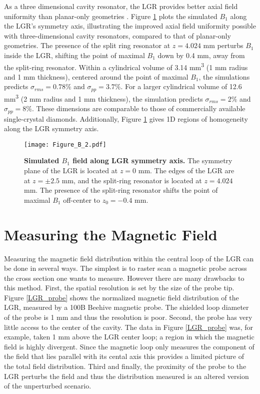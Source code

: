 As a three dimensional cavity resonator, the LGR provides better axial field uniformity than planar-only geometries \cite{floch2016towards,kapitanova2017dielectric,angerer2016collective}. Figure \ref{LGR_axial_simulated} plots the simulated $B_1$ along the LGR's symmetry axis, illustrating the improved axial field uniformity possible with three-dimensional cavity
resonators, compared to that of planar-only geometries. The presence of the split ring resonator at $z = 4.024$ mm perturbs $B_1$ inside the LGR, shifting the point of maximal $B_1$ down by 0.4 mm, away from the split-ring resonator. Within a cylindrical volume of 3.14 mm\textsuperscript{3} (1 mm radius and 1 mm thickness), centered around the point of maximal $B_1$, the simulations predicts $\sigma_{rms} = 0.78\%$ and $\sigma_{pp} = 3.7\%$. For a larger cylindrical volume of 12.6 mm\textsuperscript{3} (2 mm radius and 1 mm thickness), the simulation predicts $\sigma_{rms} = 2\%$ and $\sigma_{pp} = 8\%$. These dimensions are comparable to those of commercially available single-crystal diamonds. Additionally, Figure \ref{LGR_axial_simulated} gives 1D regions of homogeneity along the LGR symmetry axis.

\begin{figure}[t!]
\centering
\texttt{[image: Figure\_B\_2.pdf]}  
\caption{\textbf{Simulated $B_1$ field along LGR symmetry axis.} The symmetry plane of the LGR is located at $z = 0$ mm. The edges of the LGR are at $z = \pm 2.5$ mm, and the split-ring resonator is located at $z = 4.024$ mm. The presence of the split-ring resonator shifts the point of maximal $B_1$ off-center to $z_0 = -0.4$ mm.}
\label{LGR_axial_simulated}
\end{figure}

\section{Measuring the Magnetic Field} \label{field}

Measuring the magnetic field distribution within the central loop of the LGR can be done in several ways. The simplest is to raster scan a magnetic probe across the cross section one wants to measure. However there are many drawbacks to this method. First, the spatial resolution is set by the size of the probe tip. Figure \ref{LGR_probe} shows the normalized magnetic field distribution of the LGR, measured by a 100B Beehive magnetic probe. The shielded loop diameter of the probe is 1 mm and thus the resolution is poor. Second, the probe has very little access to the center of the cavity. The data in Figure \ref{LGR_probe} was, for example, taken 1 mm above the LGR center loop; a region in which the magnetic field is highly divergent. Since the magnetic loop only measures the component of the field that lies parallel with its cental axis this provides a limited picture of the total field distribution. Third and finally, the proximity of the probe to the LGR perturbs the field and thus the distribution measured is an altered version of the unperturbed scenario. 


